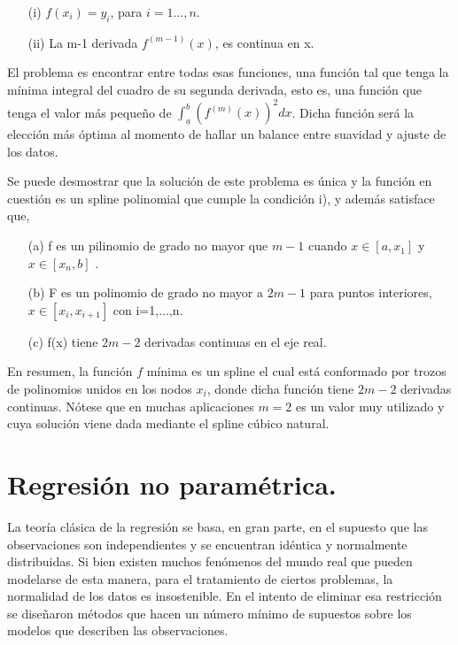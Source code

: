 \begin{itemize}
  \item[(i)] $f(x_{i})=y_{i}$, para $i=1...,n$.
  \item[(ii)] La m-1 derivada $f^{(m-1)}(x)$, es continua en x.
\end{itemize}

\hspace{0.4cm} El problema es encontrar entre todas esas funciones, una funci\'on tal que tenga la m\'inima integral del cuadro de su segunda derivada, esto es, una funci\'on que tenga el valor m\'as peque\~no de $\int_{a}^{b} (f^{(m)}(x))^2 dx$. Dicha funci\'on ser\'a la elecci\'on m\'as \'optima al momento de hallar un balance entre suavidad y ajuste de los datos.


\hspace{0.4cm} Se puede desmostrar que la soluci\'on de este problema es \'unica y la funci\'on en cuesti\'on es un spline polinomial que cumple la condici\'on i), y adem\'as satisface que,

\begin{itemize}
  \item[(a)] f es un pilinomio de grado no mayor que $m-1$ cuando $x \in [a,x_{1}]$ y $x \in [x_{n},b]$ .
  \item[(b)] F es un polinomio de grado no mayor a $2m-1$ para puntos interiores, $x \in [x_{i},x_{i+1}]$ con i=1,...,n.
  \item[(c)] f(x) tiene $2m-2$ derivadas continuas en el eje real.
\end{itemize}

\hspace{0.4cm} En resumen, la funci\'on $f$ m\'inima es un spline el cual est\'a conformado por trozos de polinomios unidos en los nodos $x_{i}$, donde dicha funci\'on tiene $2m-2$ derivadas continuas. N\'otese que en muchas aplicaciones $m=2$ es un valor muy utilizado y cuya soluci\'on viene dada mediante el spline c\'ubico natural.

\section{Regresi\'on no param\'etrica.}

\hspace{0.4cm} La teor\'ia cl\'asica de la regresi\'on se basa, en gran parte, en el supuesto que las observaciones son independientes y se encuentran id\'entica y normalmente distribuidas. Si bien existen muchos fen\'omenos del mundo real que pueden modelarse de esta manera, para el tratamiento de ciertos problemas, la normalidad de los datos es insostenible. En el intento de eliminar esa restricci\'on se dise\~naron m\'etodos que hacen un n\'umero m\'inimo de supuestos sobre los modelos que describen las observaciones.

